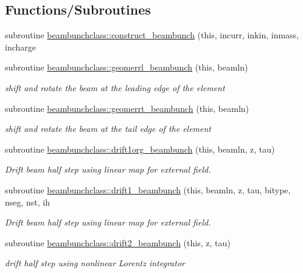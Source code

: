 \subsection*{Functions/\+Subroutines}
\begin{DoxyCompactItemize}
\item 
subroutine \mbox{\hyperlink{namespacebeambunchclass_a1605e527eb41043dc5962da1e3bb5159}{beambunchclass\+::construct\+\_\+beambunch}} (this, incurr, inkin, inmass, incharge
\item 
subroutine \mbox{\hyperlink{namespacebeambunchclass_aea8cfefa2f70ade95202cc40f015f7bf}{beambunchclass\+::geomerrl\+\_\+beambunch}} (this, beamln)
\begin{DoxyCompactList}\small\item\em shift and rotate the beam at the leading edge of the element \end{DoxyCompactList}\item 
subroutine \mbox{\hyperlink{namespacebeambunchclass_ab2f6f9e95d5786dab15c1b73f305e349}{beambunchclass\+::geomerrt\+\_\+beambunch}} (this, beamln)
\begin{DoxyCompactList}\small\item\em shift and rotate the beam at the tail edge of the element \end{DoxyCompactList}\item 
subroutine \mbox{\hyperlink{namespacebeambunchclass_a3be2b49f0fef567493258758c44fffd6}{beambunchclass\+::drift1org\+\_\+beambunch}} (this, beamln, z, tau)
\begin{DoxyCompactList}\small\item\em Drift beam half step using linear map for external field. \end{DoxyCompactList}\item 
subroutine \mbox{\hyperlink{namespacebeambunchclass_a212c0d38a812d95f238d7da7f29ac17c}{beambunchclass\+::drift1\+\_\+beambunch}} (this, beamln, z, tau, bitype, nseg, nst, ih
\begin{DoxyCompactList}\small\item\em Drift beam half step using linear map for external field. \end{DoxyCompactList}\item 
subroutine \mbox{\hyperlink{namespacebeambunchclass_a6e3aecf1a2cf3d54950c09c603c2f11c}{beambunchclass\+::drift2\+\_\+beambunch}} (this, z, tau)
\begin{DoxyCompactList}\small\item\em drift half step using nonlinear Lorentz integrator \end{DoxyCompactList}\item 

\end{DoxyCompactItemize}
